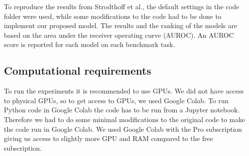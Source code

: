 To reproduce the results from Strodthoff et al., the default settings in the code folder were used, while some modifications to the code had to be done to implement our proposed model. The results and the ranking of the models are based on the area under the receiver operating curve (AUROC). An AUROC score is reported for each model on each benchmark task. 

\subsection{Computational requirements}

To run the experiments it is recommended to use GPUs. We did not have access to physical GPUs, so to get access to GPUs, we used Google Colab. To run Python code in Google Colab the code has to be run from a Jupyter notebook. Therefore we had to do some minimal modifications to the original code to make the code run in Google Colab. We used Google Colab with the Pro subscription giving us access to slightly more GPU and RAM compared to the free subscription. 


